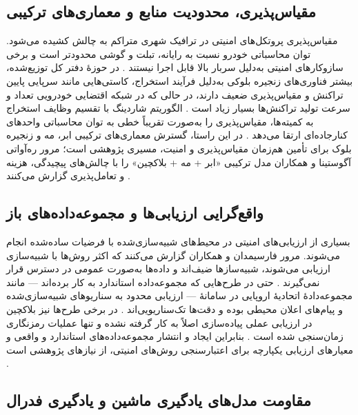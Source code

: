 \subsection{مقیاس‌پذیری، محدودیت منابع و معماری‌های ترکیبی}

مقیاس‌پذیری پروتکل‌های امنیتی در ترافیک شهری متراکم به چالش کشیده می‌شود. توان محاسباتی خودرو نسبت به رایانه، تبلت و گوشی محدودتر است و برخی سازوکارهای امنیتی به‌دلیل سربار بالا قابل اجرا نیستند \cite{farsimadanReviewSecurityChallenges2025}. در حوزهٔ دفتر کل توزیع‌شده، بیشتر فناوری‌های زنجیره بلوکی به‌دلیل فرآیند استخراج، کاستی‌هایی مانند سرپایی پایین تراکنش و مقیاس‌پذیری ضعیف دارند، در حالی که در شبکه اقتضایی خودرویی تعداد و سرعت تولید تراکنش‌ها بسیار زیاد است \cite{ghovanlooyghajarSBTMSScalableBlockchain2021}. الگوریتم شاردینگ با تقسیم وظایف استخراج به کمیته‌ها، مقیاس‌پذیری را به‌صورت تقریباً خطی به توان محاسباتی واحدهای کنارجاده‌ای ارتقا می‌دهد \cite{ghovanlooyghajarSBTMSScalableBlockchain2021}. در این راستا، گسترش معماری‌های ترکیبی ابر، مه و زنجیره بلوک برای تأمین هم‌زمان مقیاس‌پذیری و امنیت، مسیری پژوهشی است؛ مرور ره‌آواتی آگوستینا و همکاران مدل ترکیبی «ابر + مه + بلاکچین» را با چالش‌های پیچیدگی، هزینه و تعامل‌پذیری گزارش می‌کنند \cite{rahmawatiagustinaSystematicLiteratureReview2025}.

\subsection{واقع‌گرایی ارزیابی‌ها و مجموعه‌داده‌های باز}

بسیاری از ارزیابی‌های امنیتی در محیط‌های شبیه‌سازی‌شده با فرضیات ساده‌شده انجام می‌شوند. مرور فارسیمدان و همکاران گزارش می‌کنند که اکثر روش‌ها با شبیه‌سازی ارزیابی می‌شوند، شبیه‌سازها ضیف‌اند و داده‌ها به‌صورت عمومی در دسترس قرار نمی‌گیرند \cite{farsimadanReviewSecurityChallenges2025}. حتی در طرح‌هایی که مجموعه‌داده استاندارد به کار برده‌اند — مانند مجموعه‌دادهٔ  اتحادیهٔ اروپایی در سامانهٔ  — ارزیابی محدود به سناریوهای شبیه‌سازی‌شده و پیام‌های اعلان محیطی بوده و دقت‌ها تک‌سناریویی‌اند \cite{feraudoDIVADIDbasedReputation2024}. در برخی طرح‌ها نیز بلاکچین در ارزیابی عملی پیاده‌سازی اصلاً به کار گرفته نشده و تنها عملیات رمزنگاری زمان‌سنجی شده است \cite{mariaBAIVEfficientBlockchainBased2022}. بنابراین ایجاد و انتشار مجموعه‌داده‌های استاندارد و واقعی و معیارهای ارزیابی یکپارچه برای اعتبارسنجی روش‌های امنیتی، از نیازهای پژوهشی است \cite{farsimadanReviewSecurityChallenges2025}.

\subsection{مقاومت مدل‌های یادگیری ماشین و یادگیری فدرال}


